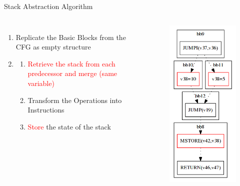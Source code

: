 \documentclass[11pt]{beamer}
\begin{document}
\begin{frame}{Stack Abstraction Algorithm}
\begin{columns}
\begin{enumerate}
    \item Replicate the Basic Blocks from the CFG as empty structure
    \item {}
        \begin{enumerate}
            \item<2-> \textcolor{red}{Retrieve the stack from each predecessor and merge (same variable)}
            \item<1-> Transform the Operations into Instructions
            \item<1-> \textcolor{red}{Store} the state of the stack
        \end{enumerate}
\end{enumerate}
\begin{figure}
    \centering
    \includegraphics[scale=0.25]{figures/cfg_abstract2.png}
\end{figure}
\end{columns}
\end{frame}
\end{document}
